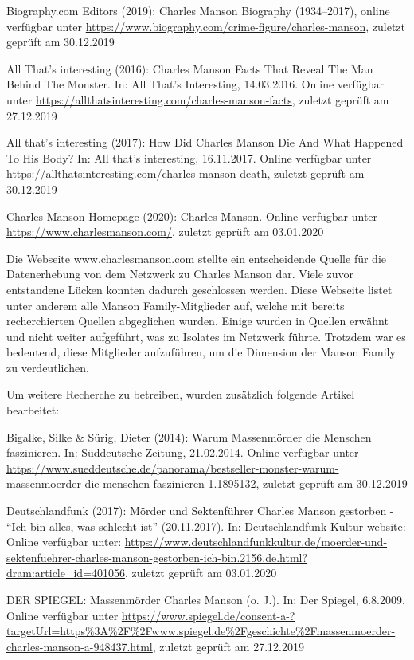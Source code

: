 \documentclass[
]{article}
\begin{document}
Biography.com Editors (2019): Charles Manson Biography (1934--2017),
online verfügbar unter
\url{https://www.biography.com/crime-figure/charles-manson}, zuletzt
geprüft am 30.12.2019

All That's interesting (2016): Charles Manson Facts That Reveal The Man
Behind The Monster. In: All That's Interesting, 14.03.2016. Online
verfügbar unter
\url{https://allthatsinteresting.com/charles-manson-facts}, zuletzt
geprüft am 27.12.2019

All that's interesting (2017): How Did Charles Manson Die And What
Happened To His Body? In: All that's interesting, 16.11.2017. Online
verfügbar unter
\url{https://allthatsinteresting.com/charles-manson-death}, zuletzt
geprüft am 30.12.2019

Charles Manson Homepage (2020): Charles Manson. Online verfügbar unter
\url{https://www.charlesmanson.com/}, zuletzt geprüft am 03.01.2020

Die Webseite www.charlesmanson.com stellte ein entscheidende Quelle für
die Datenerhebung von dem Netzwerk zu Charles Manson dar. Viele zuvor
entstandene Lücken konnten dadurch geschlossen werden. Diese Webseite
listet unter anderem alle Manson Family-Mitglieder auf, welche mit
bereits recherchierten Quellen abgeglichen wurden. Einige wurden in
Quellen erwähnt und nicht weiter aufgeführt, was zu Isolates im Netzwerk
führte. Trotzdem war es bedeutend, diese Mitglieder aufzuführen, um die
Dimension der Manson Family zu verdeutlichen.

Um weitere Recherche zu betreiben, wurden zusätzlich folgende Artikel
bearbeitet:

Bigalke, Silke \& Sürig, Dieter (2014): Warum Massenmörder die Menschen
faszinieren. In: Süddeutsche Zeitung, 21.02.2014. Online verfügbar unter
\url{https://www.sueddeutsche.de/panorama/bestseller-monster-warum-massenmoerder-die-menschen-faszinieren-1.1895132},
zuletzt geprüft am 30.12.2019

Deutschlandfunk (2017): Mörder und Sektenführer Charles Manson gestorben
- ``Ich bin alles, was schlecht ist'' (20.11.2017). In: Deutschlandfunk
Kultur website: Online verfügbar unter:
\url{https://www.deutschlandfunkkultur.de/moerder-und-sektenfuehrer-charles-manson-gestorben-ich-bin.2156.de.html?dram:article_id=401056},
zuletzt geprüft am 03.01.2020

DER SPIEGEL: Massenmörder Charles Manson (o. J.). In: Der Spiegel,
6.8.2009. Online verfügbar unter
\url{https://www.spiegel.de/consent-a-?targetUrl=https\%3A\%2F\%2Fwww.spiegel.de\%2Fgeschichte\%2Fmassenmoerder-charles-manson-a-948437.html},
zuletzt geprüft am 27.12.2019
\end{document}
